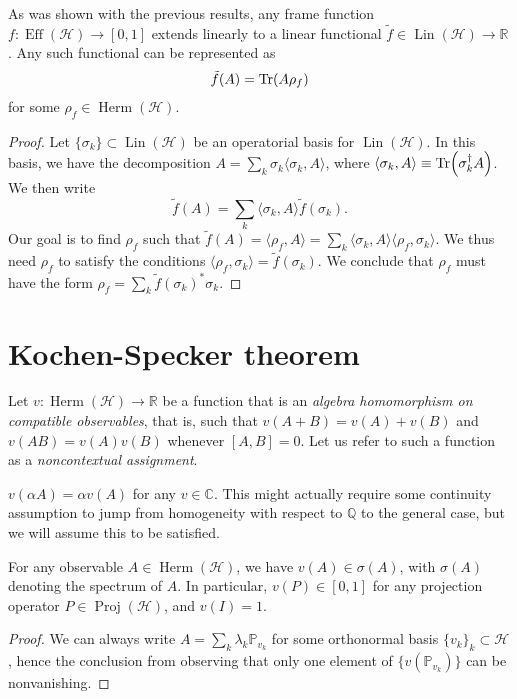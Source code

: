 \documentclass[12pt]{report}
\newcommand{\CC}{\mathbb{C}}
\newcommand{\PP}{\mathbb{P}}
\newcommand{\QQ}{\mathbb{Q}}
\newcommand{\RR}{\mathbb{R}}
\newcommand{\on}[1]{\operatorname{#1}}
\newcommand{\calH}{{\mathcal{H}}}
\DeclareMathOperator{\Herm}{Herm}
\DeclareMathOperator{\Lin}{Lin}
\begin{document}
\begin{prop}
	As was shown with the previous results, any frame function $f:\on{Eff}(\calH)\to[0,1]$ extends linearly to a linear functional $\tilde f\in\Lin(\calH)\to\RR$. Any such functional can be represented as
	\begin{equation}
		\tilde f(A) = \Tr(A \rho_f)
	\end{equation}
	for some $\rho_f\in\Herm(\calH)$.
\end{prop}
\begin{proof}
	Let $\{\sigma_k\}\subset\Lin(\calH)$ be an operatorial basis for $\Lin(\calH)$.
	In this basis, we have the decomposition $A=\sum_k \sigma_k \langle \sigma_k, A\rangle$, where $\langle \sigma_k,A\rangle\equiv\Tr(\sigma_k^\dagger A)$.
	We then write
	\begin{equation}
		\tilde f(A) = \sum_k \langle \sigma_k,A\rangle \tilde f(\sigma_k).
	\end{equation}
	Our goal is to find $\rho_f$ such that $\tilde f(A)=\langle \rho_f,A\rangle = \sum_k \langle\sigma_k,A\rangle \langle\rho_f,\sigma_k\rangle$.
	We thus need $\rho_f$ to satisfy the conditions
	$\langle\rho_f,\sigma_k\rangle = \tilde f(\sigma_k)$.
	We conclude that $\rho_f$ must have the form $\rho_f=\sum_k \tilde f(\sigma_k)^* \sigma_k$.
\end{proof}

\section{Kochen-Specker theorem}

\begin{defn}
	Let $v:\Herm(\calH)\to\RR$ be a function that is an \emph{algebra homomorphism on compatible observables}, that is, such that $v(A+B)=v(A)+v(B)$ and $v(AB)=v(A)v(B)$ whenever $[A,B]=0$.
	Let us refer to such a function as a \emph{noncontextual assignment}.
\end{defn}

\begin{prop}
	$v(\alpha A)=\alpha v(A)$ for any $v\in \CC$. This might actually require some continuity assumption to jump from homogeneity with respect to $\QQ$ to the general case, but we will assume this to be satisfied.
\end{prop}

\begin{prop}
	For any observable $A\in\Herm(\calH)$, we have $v(A)\in\sigma(A)$, with $\sigma(A)$ denoting the spectrum of $A$. In particular, $v(P)\in[0,1]$ for any projection operator $P\in\on{Proj}(\calH)$, and $v(I)=1$.
\end{prop}
\begin{proof}
	We can always write $A=\sum_k\lambda_k \PP_{v_k}$ for some orthonormal basis $\{v_k\}_k\subset\calH$, hence the conclusion from observing that only one element of $\{v(\PP_{v_k})\}$ can be nonvanishing.
\end{proof}
\end{document}
